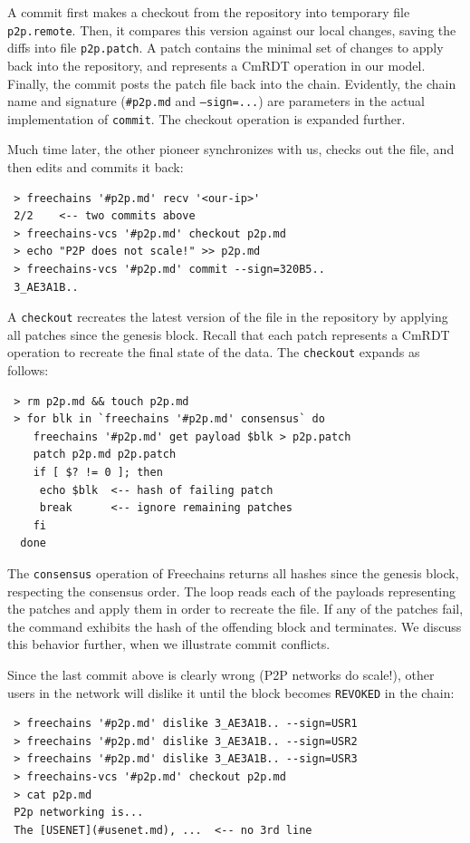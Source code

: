 \documentclass[10pt,journal,compsoc]{IEEEtran}
\newcommand{\FC}       {Freechains\xspace}
\newcommand{\code}[1]  {\texttt{\footnotesize{#1}}}
\begin{document}
A commit first makes a checkout from the repository into temporary file
\code{p2p.remote}.
Then, it compares this version against our local changes, saving the diffs
into file \code{p2p.patch}.
A patch contains the minimal set of changes to apply back into the repository,
and represents a CmRDT operation in our model.
Finally, the commit posts the patch file back into the chain.
Evidently, the chain name and signature (\code{\#p2p.md} and \code{--sign=...})
are parameters in the actual implementation of \code{commit}.
The checkout operation is expanded further.

Much time later, the other pioneer synchronizes with us, checks out the file,
and then edits and commits it back:

{\footnotesize
\begin{verbatim}
 > freechains '#p2p.md' recv '<our-ip>'
 2/2    <-- two commits above
 > freechains-vcs '#p2p.md' checkout p2p.md
 > echo "P2P does not scale!" >> p2p.md
 > freechains-vcs '#p2p.md' commit --sign=320B5..
 3_AE3A1B..
\end{verbatim}
}

A \code{checkout} recreates the latest version of the file in the repository by
applying all patches since the genesis block.
Recall that each patch represents a CmRDT operation to recreate the final state
of the data.
The \code{checkout} expands as follows:

{\footnotesize
\begin{verbatim}
 > rm p2p.md && touch p2p.md
 > for blk in `freechains '#p2p.md' consensus` do
    freechains '#p2p.md' get payload $blk > p2p.patch
    patch p2p.md p2p.patch
    if [ $? != 0 ]; then
     echo $blk  <-- hash of failing patch
     break      <-- ignore remaining patches
    fi
  done
\end{verbatim}
}

The \code{consensus} operation of \FC returns all hashes since
the genesis block, respecting the consensus order.
The loop reads each of the payloads representing the patches and apply them in
order to recreate the file.
If any of the patches fail, the command exhibits the hash of the offending
block and terminates.
We discuss this behavior further, when we illustrate commit conflicts.

Since the last commit above is clearly wrong (P2P networks do scale!), other
users in the network will dislike it until the block becomes
\code{REVOKED} in the chain: %

{\footnotesize
\begin{verbatim}
 > freechains '#p2p.md' dislike 3_AE3A1B.. --sign=USR1
 > freechains '#p2p.md' dislike 3_AE3A1B.. --sign=USR2
 > freechains '#p2p.md' dislike 3_AE3A1B.. --sign=USR3
 > freechains-vcs '#p2p.md' checkout p2p.md
 > cat p2p.md
 P2p networking is...
 The [USENET](#usenet.md), ...  <-- no 3rd line
\end{verbatim}
}
\end{document}
